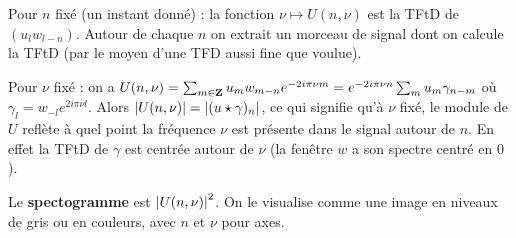 Pour $n$ fixé (un instant donné) : la fonction $\nu \mapsto U(n,\nu)$ est la TFtD de $(u_l w_{l-n})$.
Autour de chaque $n$ on extrait un morceau de signal dont on calcule la TFtD (par le moyen d'une TFD aussi fine que voulue).

Pour $\nu$ fixé : on a $U(n,\nu) = \sum_{m \in \mathbf{Z}} u_m w_{m - n} e^{-2i\pi \nu m} = e^{-2i\pi \nu n} \sum_m u_m \gamma_{n - m}$ où $\gamma_l = w_{-l} e^{2i\pi \nu l}$.
Alors $\left\lvert U(n,\nu)\right\rvert = \left\lvert(u \star \gamma)_n\right\rvert$, ce qui signifie qu'à $\nu$ fixé, le module de $U$ reflète à quel point la fréquence $\nu$ est présente dans le signal autour de $n$.
En effet la TFtD de $\gamma$ est centrée autour de $\nu$ (la fenêtre $w$ a son spectre centré en $0$).

Le \textbf{spectogramme} est $\left\lvert U(n,\nu)\right\rvert^2$.
On le visualise comme une image en niveaux de gris ou en couleurs, avec $n$ et $\nu$ pour axes.